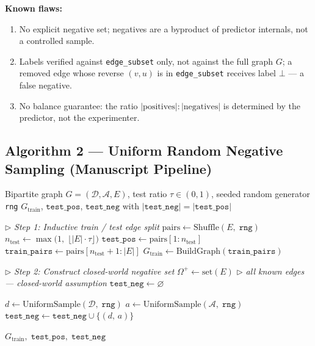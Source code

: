 \documentclass[12pt, a4paper]{article}
\newcommand{\set}[1]{\mathcal{#1}}                  %
\newcommand{\posset}{\Omega^{+}}                    %
\renewcommand{\algorithmiccomment}[1]{\hfill\(\triangleright\) \textit{\small #1}}
\begin{document}
\noindent\textbf{Known flaws:}
\begin{enumerate}
  \item No explicit negative set; negatives are a byproduct of predictor
        internals, not a controlled sample.
  \item Labels verified against \texttt{edge\_subset} only, not against the
        full graph $G$; a removed edge whose reverse $(v,u)$ is in
        \texttt{edge\_subset} receives label $\bot$ — a false negative.
  \item No balance guarantee: the ratio
        $|\text{positives}|{:}|\text{negatives}|$
        is determined by the predictor, not the experimenter.
\end{enumerate}

\subsection*{Algorithm 2 — Uniform Random Negative Sampling (Manuscript Pipeline)}

\begin{algorithm}[H]
\caption{Uniform Random Negative Sampling}
\label{alg:uniform}
\begin{algorithmic}[1]
    \Require Bipartite graph $G = (\set{D}, \set{A}, E)$,
             test ratio $\tau \in (0,1)$,
             seeded random generator \texttt{rng}
    \Ensure  $G_{\text{train}}$,\;
             $\texttt{test\_pos}$,\;
             $\texttt{test\_neg}$ with
             $|\texttt{test\_neg}| = |\texttt{test\_pos}|$

    \medskip
    \State \algorithmiccomment{Step 1: Inductive train / test edge split}
    \State $\text{pairs} \leftarrow \text{Shuffle}(E,\;\texttt{rng})$
    \State $n_{\text{test}} \leftarrow \max\!\bigl(1,\;\lfloor|E|\cdot\tau\rfloor\bigr)$
    \State $\texttt{test\_pos}   \leftarrow \text{pairs}[1 \mathbin{:} n_{\text{test}}]$
    \State $\texttt{train\_pairs}\leftarrow \text{pairs}[n_{\text{test}}+1 \mathbin{:} |E|]$
    \State $G_{\text{train}} \leftarrow \text{BuildGraph}(\texttt{train\_pairs})$

    \medskip
    \State \algorithmiccomment{Step 2: Construct closed-world negative set}
    \State $\posset \leftarrow \text{set}(E)$
    \algorithmiccomment{all known edges — closed-world assumption}
    \State $\texttt{test\_neg} \leftarrow \varnothing$

        \State $d \leftarrow \text{UniformSample}(\set{D},\;\texttt{rng})$
        \State $a \leftarrow \text{UniformSample}(\set{A},\;\texttt{rng})$
        \If{$(d,\,a) \notin \posset$}
            \State $\texttt{test\_neg} \leftarrow
                   \texttt{test\_neg} \cup \{(d,\,a)\}$
        \EndIf
    \EndWhile

    \State \Return $G_{\text{train}},\;\texttt{test\_pos},\;\texttt{test\_neg}$
\end{algorithmic}
\end{algorithm}
\end{document}
